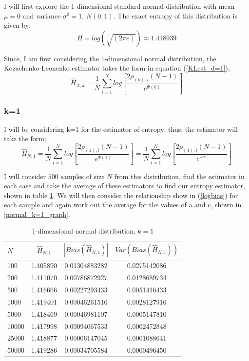 \documentclass{article}
\begin{document}
I will first explore the 1-dimensional standard normal distribution with mean $\mu = 0$ and variance $\sigma^2 = 1$, $N(0, 1)$. The exact entropy of this distribution is given by;
\begin{equation} \label{normal_exact}
H = log(\sqrt{(2\pi e)}) \approx 1.418939
\end{equation}

Since, I am first considering the 1-dimensional normal distribution, the Kozachenko-Leonenko estimator takes the form in equation (\ref{KLest_d=1});
\begin{equation}
\hat{H}_{N, k} =  \frac{1}{N} \sum_{i=1}^{N} log \left[ \frac{2\rho_{(k),i}(N-1)}{e^{\Psi(k)}} \right]\nonumber
\end{equation}




\subsubsection{k=1} \label{N_k=1}
I will be considering k=1 for the estimator of entropy; thus, the estimator will take the form;
\begin{equation} 
\hat{H}_{N, 1} = \frac{1}{N} \sum_{i=1}^{N} log \left[ \frac{2\rho_{(1),i} (N-1)}{e^{\Psi(1)}} \right] = \frac{1}{N} \sum_{i=1}^{N} log \left[ \frac{2\rho_{(1),i} (N-1)}{e^{-\gamma}} \right] \nonumber
\end{equation}

I will consider $500$ samples of size $N$ from this distribution, find the estimator in each case and take the average of these estimators to find our entropy estimator, shown in table \ref{normal_k=1_table}. We will then consider the relationship show in (\ref{logbias}) for each sample and again work out the average for the values of a and c, shown in \ref{normal_k=1_graph}.

\begin{table}
\caption{1-dimensional normal distribution, $k=1$} \label{normal_k=1_table}
\begin{center}
\begin{tabular}{| l | c c c|} 
\toprule
$N$ & $\hat{H}_{N, 1}$ & $|Bias(\hat{H}_{N, 1})|$ & $Var(Bias(\hat{H}_{N, 1}))$ \\
\midrule[1pt]
100     & 1.405890     & 0.01304883282     & 0.0275142086  \\
200     & 1.411070     & 0.00786872927     & 0.0128689734  \\
500     & 1.416666     & 0.00227293433     & 0.0051416433  \\
1000    & 1.419401     & 0.00046261516     & 0.0028127916  \\
5000    & 1.418469     & 0.00046981107     & 0.0005147810  \\
10000   & 1.417998     & 0.00094067533     & 0.0002472848  \\
25000   & 1.418877     & 0.00006147045     & 0.0001088641  \\
50000   & 1.419286     & 0.00034705584     & 0.0000496450  \\
\hline
\end{tabular}
\end{center}
\end{table}
\end{document}
